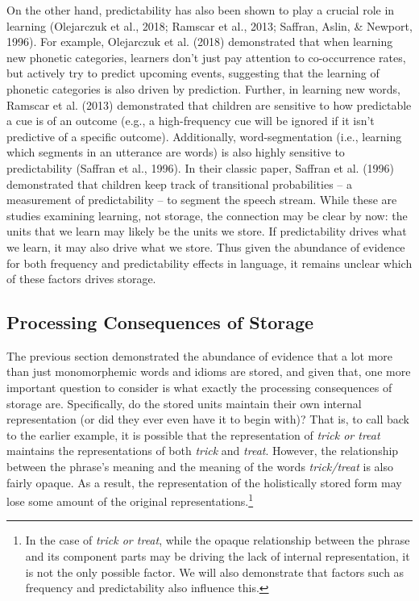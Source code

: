 \documentclass[
  man,floatsintext]{apa6}
\begin{document}
On the other hand, predictability has also been shown to play a crucial role in learning (Olejarczuk et al., 2018; Ramscar et al., 2013; Saffran, Aslin, \& Newport, 1996). For example, Olejarczuk et al. (2018) demonstrated that when learning new phonetic categories, learners don't just pay attention to co-occurrence rates, but actively try to predict upcoming events, suggesting that the learning of phonetic categories is also driven by prediction. Further, in learning new words, Ramscar et al. (2013) demonstrated that children are sensitive to how predictable a cue is of an outcome (e.g., a high-frequency cue will be ignored if it isn't predictive of a specific outcome). Additionally, word-segmentation (i.e., learning which segments in an utterance are words) is also highly sensitive to predictability (Saffran et al., 1996). In their classic paper, Saffran et al. (1996) demonstrated that children keep track of transitional probabilities -- a measurement of predictability -- to segment the speech stream. While these are studies examining learning, not storage, the connection may be clear by now: the units that we learn may likely be the units we store. If predictability drives what we learn, it may also drive what we store. Thus given the abundance of evidence for both frequency and predictability effects in language, it remains unclear which of these factors drives storage.

\subsection{Processing Consequences of Storage}\label{processing-consequences-of-storage}

The previous section demonstrated the abundance of evidence that a lot more than just monomorphemic words and idioms are stored, and given that, one more important question to consider is what exactly the processing consequences of storage are. Specifically, do the stored units maintain their own internal representation (or did they ever even have it to begin with)? That is, to call back to the earlier example, it is possible that the representation of \emph{trick or treat} maintains the representations of both \emph{trick} and \emph{treat}. However, the relationship between the phrase's meaning and the meaning of the words \emph{trick/treat} is also fairly opaque. As a result, the representation of the holistically stored form may lose some amount of the original representations.\footnote{In the case of \emph{trick or treat}, while the opaque relationship between the phrase and its component parts may be driving the lack of internal representation, it is not the only possible factor. We will also demonstrate that factors such as frequency and predictability also influence this.}
\end{document}
